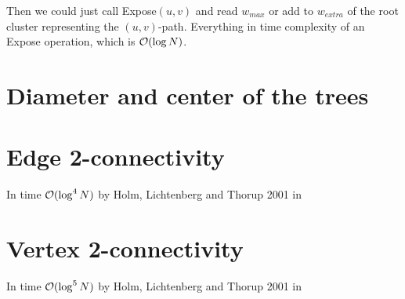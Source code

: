 Then we could just call {\sc Expose}$(u,v)$ and read $w_{max}$ or add to $w_{extra}$
of the root cluster representing the $(u,v)$-path. Everything in time complexity
of an {\sc Expose} operation, which is ${\cal O}(\log N)$.


\section{Diameter and center of the trees}


\section{Edge 2-connectivity}

In time ${\cal O}(\log^4 N)$ by Holm, Lichtenberg and Thorup 2001 in \cite{PolylogarithmicAlgorithmsForConnectivity}



\section{Vertex 2-connectivity}

In time ${\cal O}(\log^5 N)$ by Holm, Lichtenberg and Thorup 2001 in \cite{PolylogarithmicAlgorithmsForConnectivity}

